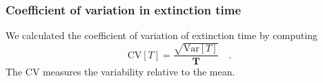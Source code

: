 \documentclass[9pt,lineno]{elife}
\begin{document}
\subsubsection{Coefficient of variation in extinction time}

We calculated the coefficient of variation of extinction time by computing 
%
\begin{equation}
    \mathrm{CV}[T] = \frac{\sqrt{\mathrm{Var}[T]}}{\mathbf{T}} \quad . 
    \label{eq:CV}
\end{equation}
%
The CV measures the variability relative to the mean.










%
\end{document}
